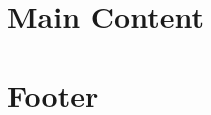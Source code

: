 \documentclass{article}
\newcommand{\blade}[1]{}
\begin{document}
\title{\blade{{ $title }}}

\section{Main Content}
\blade{@yield('content')}

\section{Footer}
\blade{@include('latex.partials.footer')}
\end{document}
